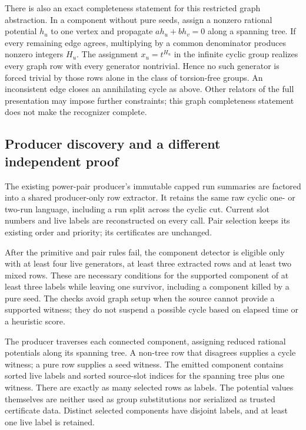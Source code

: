 There is also an exact completeness statement for this restricted graph
abstraction. In a component without pure seeds, assign a nonzero rational
potential $h_u$ to one vertex and propagate $a h_u+b h_v=0$ along a spanning
tree. If every remaining edge agrees, multiplying by a common denominator
produces nonzero integers $H_u$. The assignment $x_u=t^{H_u}$ in the infinite
cyclic group realizes every graph row with every generator nontrivial. Hence
no such generator is forced trivial by those rows alone in the class of
torsion-free groups. An inconsistent edge closes an annihilating cycle as
above. Other relators of the full presentation may impose further constraints;
this graph completeness statement does not make the recognizer complete.

\subsection{Producer discovery and a different independent proof}

The existing power-pair producer's immutable capped run summaries are factored
into a shared producer-only row extractor. It retains the same raw cyclic
one- or two-run language, including a run split across the cyclic cut. Current
slot numbers and live labels are reconstructed on every call. Pair selection
keeps its existing order and priority; its certificates are unchanged.

After the primitive and pair rules fail, the component detector is eligible
only with at least four live generators, at least three extracted rows and
at least two mixed rows. These are necessary conditions for the supported
component of at least three labels while leaving one survivor, including a
component killed by a pure seed. The checks avoid graph setup when the source
cannot provide a supported witness; they do not suspend a possible cycle
based on elapsed time or a heuristic score.

The producer traverses each connected component, assigning reduced rational
potentials along its spanning tree. A non-tree row that disagrees supplies a
cycle witness; a pure row supplies a seed witness. The emitted component
contains sorted live labels and sorted source-slot indices for the spanning
tree plus one witness. There are exactly as many selected rows as labels.
The potential values themselves are neither used as group substitutions nor
serialized as trusted certificate data. Distinct selected components have
disjoint labels, and at least one live label is retained.


